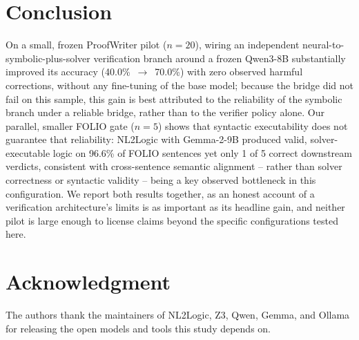 \documentclass[conference]{IEEEtran}
\begin{document}
\section{Conclusion}
On a small, frozen ProofWriter pilot ($n=20$), wiring an independent neural-to-symbolic-plus-solver verification branch around a frozen Qwen3-8B substantially improved its accuracy (40.0\%~$\to$~70.0\%) with zero observed harmful corrections, without any fine-tuning of the base model; because the bridge did not fail on this sample, this gain is best attributed to the reliability of the symbolic branch under a reliable bridge, rather than to the verifier policy alone. Our parallel, smaller FOLIO gate ($n=5$) shows that syntactic executability does not guarantee that reliability: NL2Logic with Gemma-2-9B produced valid, solver-executable logic on 96.6\% of FOLIO sentences yet only 1 of 5 correct downstream verdicts, consistent with cross-sentence semantic alignment -- rather than solver correctness or syntactic validity -- being a key observed bottleneck in this configuration. We report both results together, as an honest account of a verification architecture's limits is as important as its headline gain, and neither pilot is large enough to license claims beyond the specific configurations tested here.

\section*{Acknowledgment}
The authors thank the maintainers of NL2Logic, Z3, Qwen, Gemma, and Ollama for releasing the open models and tools this study depends on.



\end{document}
